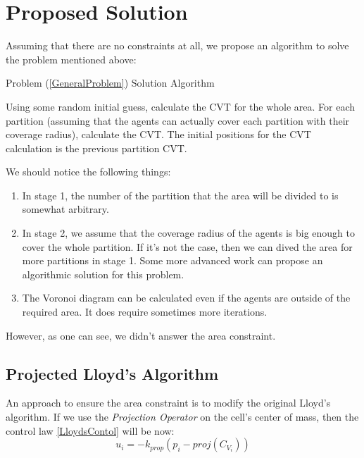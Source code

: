 \documentclass{iacas}
\begin{document}
\section{Proposed Solution}
Assuming that there are no constraints at all, we propose an algorithm to solve the problem mentioned above:
\begin{algorithm}
\caption{Problem (\ref{GeneralProblem}) Solution Algorithm}\label{GeneralProbSolution}
\begin{algorithmic}[1]
\State Using some random initial guess, calculate the CVT for the whole area.
\State For each partition (assuming that the agents can actually cover each partition with their coverage radius), calculate the CVT. The initial positions for the CVT calculation is the previous partition CVT.
\end{algorithmic}
\end{algorithm}

We should notice the following things:
\begin{enumerate}
\item In stage 1, the number of the partition that the area will be divided to is somewhat arbitrary.
\item In stage 2, we assume that the coverage radius of the agents is big enough to cover the whole partition. If it's not the case, then we can dived the area for more partitions in stage 1. Some more advanced work can propose an algorithmic solution for this problem.
\item The Voronoi diagram can be calculated even if the agents are outside of the required area. It does require sometimes more iterations.
\end{enumerate}

However, as one can see, we didn't answer the area constraint.
\subsection{Projected Lloyd's Algorithm}
An approach to ensure the area constraint is to modify the original Lloyd's algorithm. If we use the \emph{Projection Operator} on the cell's center of mass, then the control law \ref{LloydsContol} will be now:
\begin{equation} \label{ProjectedLloydsContol}
u_{i} = -k_{prop}\left( p_i - \textit{proj}\left( C_{V_{i}} \right) \right)
\end{equation} 
\end{document}
